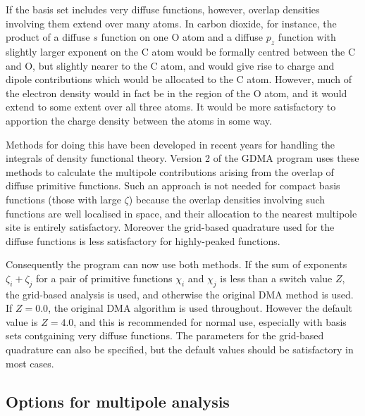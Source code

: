 \documentclass[12pt,txfonts]{paper}
\let\cite=\citep
\begin{document}
If the basis set includes very diffuse functions, however, overlap
densities involving them extend over many atoms. In carbon dioxide,
for instance, the product of a diffuse $s$ function on one O atom and
a diffuse $p_z$ function with slightly larger exponent on the C atom
would be formally centred between the C and O, but slightly nearer to
the C atom, and would give rise to charge and dipole contributions
which would be allocated to the C atom. However, much of the electron
density would in fact be in the region of the O atom, and it would
extend to some extent over all three atoms. It would be more
satisfactory to apportion the charge density between the atoms in some
way.

Methods for doing this have been developed in recent years for
handling the integrals of density functional theory. Version 2 of the
GDMA program\cite{Stone05b} uses these methods to calculate the multipole
contributions arising from the overlap of diffuse primitive functions.
Such an approach is not needed for compact basis functions (those with
large $\zeta$) because the overlap densities involving such functions
are well localised in space, and their allocation to the nearest
multipole site is entirely satisfactory. Moreover the grid-based
quadrature used for the diffuse functions is less satisfactory for
highly-peaked functions.

Consequently the program can now use both methods. If the sum of
exponents $\zeta_i+\zeta_j$ for a pair of primitive functions $\chi_i$
and $\chi_j$ is less than a switch value $Z$, the grid-based analysis
is used, and otherwise the original DMA method is used. If $Z=0.0$,
the original DMA algorithm is used throughout. However the default
value is $Z=4.0$, and this is recommended for normal use, especially
with basis sets contgaining very diffuse functions. The parameters for
the grid-based quadrature can also be specified, but the default
values should be satisfactory in most cases.

\subsection {Options for multipole analysis}
\end{document}
